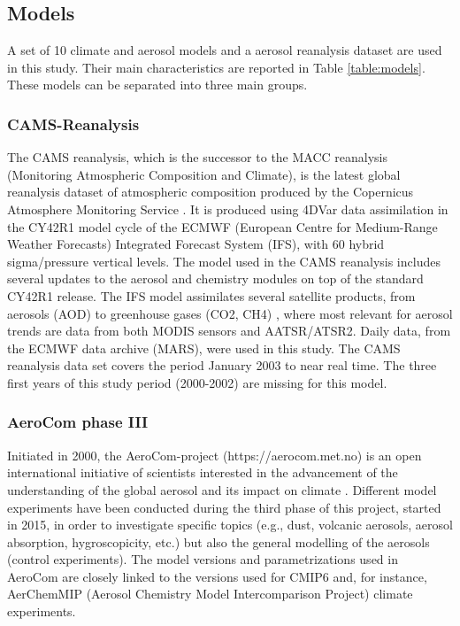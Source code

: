 \documentclass[acp, manuscript]{copernicus}
\begin{document}
\subsection{Models}
A set of 10 climate and aerosol models and a aerosol reanalysis dataset are used in this study. Their main characteristics are reported in Table \ref{table:models}. These models can be separated into three main groups.

\subsubsection{CAMS-Reanalysis}
The CAMS reanalysis, which is the successor to the MACC reanalysis (Monitoring Atmospheric Composition and Climate), is the latest global reanalysis dataset of atmospheric composition produced by the Copernicus Atmosphere Monitoring Service \citep{inness2019cams}. It is produced using 4DVar data assimilation in the CY42R1 model cycle of the ECMWF (European Centre for Medium-Range Weather Forecasts) Integrated Forecast System (IFS), with 60 hybrid sigma/pressure vertical levels. The model used in the CAMS reanalysis includes several updates to the aerosol and chemistry modules on top of the standard CY42R1 release. The IFS model assimilates several satellite products, from aerosols (AOD) to greenhouse gases (CO2, CH4) \citep{inness2019cams}, where most relevant for aerosol trends are data from both MODIS sensors and AATSR/ATSR2. Daily data, from the ECMWF data archive (MARS), were used in this study. The CAMS reanalysis data set covers the period January 2003 to near real time. The three first years of this study period (2000-2002) are missing for this model.

\subsubsection{AeroCom phase III}
Initiated in 2000, the AeroCom-project (https://aerocom.met.no) is an open international initiative of scientists interested in the advancement of the understanding of the global aerosol and its impact on climate \citep{schulz2006radiative}. Different model experiments have been conducted during the third phase of this project, started in 2015, in order to investigate specific topics (e.g., dust, volcanic aerosols, aerosol absorption, hygroscopicity, etc.) but also the general modelling of the aerosols (control experiments). The model versions and parametrizations used in AeroCom are closely linked to the versions used for CMIP6 and, for instance, AerChemMIP (Aerosol Chemistry Model Intercomparison Project) climate experiments.
\end{document}
